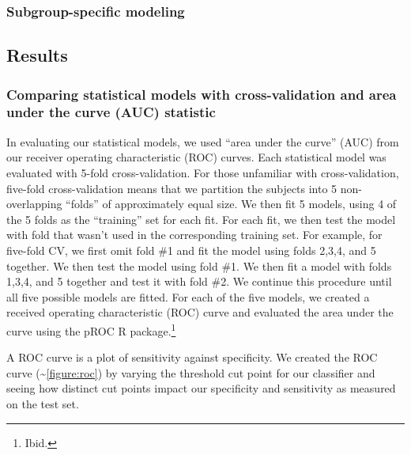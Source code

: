 \documentclass[11pt,]{article}
\let\rmarkdownfootnote\footnote%
\def\footnote{\protect\rmarkdownfootnote}
\begin{document}
\subsubsection{Subgroup-specific
modeling}\label{subgroup-specific-modeling}

\subsection{Results}\label{results}


\subsubsection{Comparing statistical models with cross-validation and
area under the curve (AUC)
statistic}\label{comparing-statistical-models-with-cross-validation-and-area-under-the-curve-auc-statistic}

In evaluating our statistical models, we used ``area under the curve''
(AUC) from our receiver operating characteristic (ROC) curves. Each
statistical model was evaluated with 5-fold cross-validation. For those
unfamiliar with cross-validation, five-fold cross-validation means that
we partition the subjects into 5 non-overlapping ``folds'' of
approximately equal size. We then fit 5 models, using 4 of the 5 folds
as the ``training'' set for each fit. For each fit, we then test the
model with fold that wasn't used in the corresponding training set. For
example, for five-fold CV, we first omit fold \#1 and fit the model
using folds 2,3,4, and 5 together. We then test the model using fold
\#1. We then fit a model with folds 1,3,4, and 5 together and test it
with fold \#2. We continue this procedure until all five possible models
are fitted. For each of the five models, we created a received operating
characteristic (ROC) curve and evaluated the area under the curve using
the pROC R package.\footnote{Ibid. }

A ROC curve is a plot of sensitivity against specificity. We created the
ROC curve (\textasciitilde{}\ref{figure:roc})
by varying the threshold cut point for our classifier and seeing how
distinct cut points impact our specificity and sensitivity as measured
on the test set.
\end{document}
